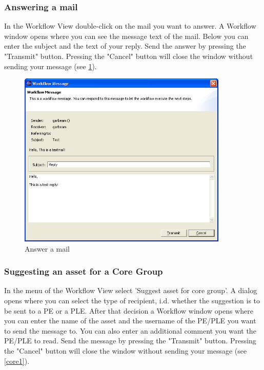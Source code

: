 \subsubsection{Answering a mail}

In the Workflow View double-click on the mail you want to answer. A Workflow
window opens where you can see the message text of the mail. Below you can enter
the subject and the text of your reply. Send the answer by pressing the "Transmit" 
button. Pressing the "Cancel" button will close the window without sending 
your message (see \ref{answermail}).

\begin{figure}[h!]
\begin{center}
\includegraphics[width=10cm]{answermail.png}
   \caption{Answer a mail}
\label{answermail}
\end{center}
\end{figure}\par

\subsubsection{Suggesting an asset for a Core Group}

In the menu of the Workflow View select 'Suggest asset for core group'. A dialog opens where
 you can select the type of recipient, i.d. whether the suggestion is to be sent to a PE or a PLE. After
 that decision a Workflow
window opens where you can enter the name of the asset and the username of the
PE/PLE you want to send the message to. You can also enter an additional comment you want 
the PE/PLE to read. Send the message by pressing the "Transmit" 
button. Pressing the "Cancel" button will close the window without sending 
your message (see \ref{core1}).


